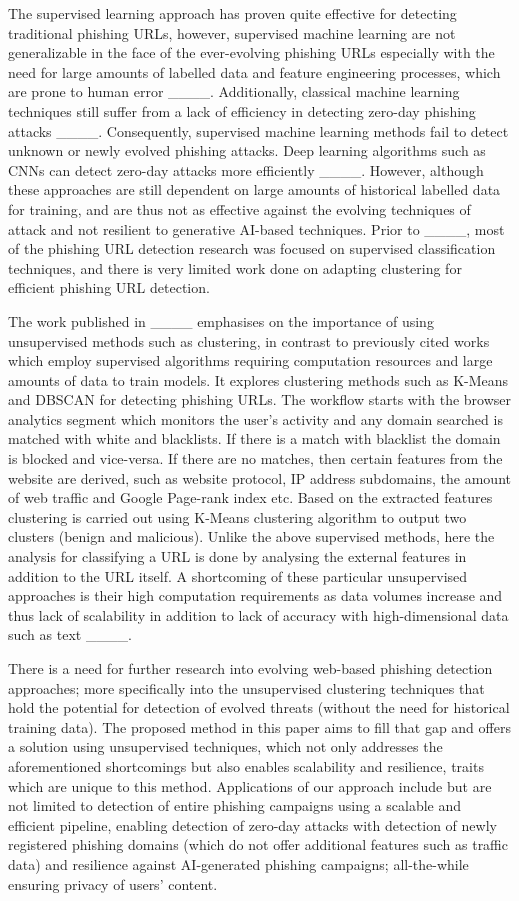 The supervised learning approach has proven quite effective for detecting traditional phishing URLs, however, supervised machine learning are not generalizable in the face of the ever-evolving phishing URLs especially with the need for large amounts of labelled data and feature engineering processes, which are prone to human error ____. Additionally, classical machine learning techniques still suffer from a lack of efficiency in detecting zero-day phishing attacks ____. Consequently, supervised machine learning methods fail to detect unknown or newly evolved phishing attacks. Deep learning algorithms such as CNNs can detect zero-day attacks more efficiently ____. However, although these approaches are still dependent on large amounts of historical labelled data for training, and are thus not as effective against the evolving techniques of attack and not resilient to generative AI-based techniques. Prior to ____, most of the phishing URL detection research was focused on supervised classification techniques, and there is very limited work done on adapting clustering for efficient phishing URL detection.

The work published in ____ emphasises on the importance of using unsupervised methods such as clustering, in contrast to previously cited works which employ supervised algorithms requiring computation resources and large amounts of data to train models. It explores clustering methods such as K-Means and DBSCAN for detecting phishing URLs. The workflow starts with the browser analytics segment which monitors the user’s activity and any domain searched is matched with white and blacklists. If there is a match with blacklist the domain is blocked and vice-versa. If there are no matches, then certain features from the website are derived, such as website protocol, IP address subdomains, the amount of web traffic and Google Page-rank index etc. Based on the extracted features clustering is carried out using K-Means clustering algorithm to output two clusters (benign and malicious). Unlike the above supervised methods, here the analysis for classifying a URL is done by analysing the external features in addition to the URL itself. A shortcoming of these particular unsupervised approaches is their high computation requirements as data volumes increase and thus lack of scalability in addition to lack of accuracy with high-dimensional data such as text ____.

There is a need for further research into evolving web-based phishing detection approaches; more specifically into the unsupervised clustering techniques that hold the potential for detection of evolved threats (without the need for historical training data). The proposed method in this paper aims to fill that gap and offers a solution using unsupervised techniques, which not only addresses the aforementioned shortcomings but also enables scalability and resilience, traits which are unique to this method. Applications of our approach include but are not limited to detection of entire phishing campaigns using a scalable and efficient pipeline, enabling detection of zero-day attacks with detection of newly registered phishing domains (which do not offer additional features such as traffic data) and resilience against AI-generated phishing campaigns; all-the-while ensuring privacy of users’ content.